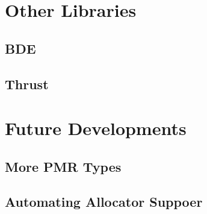 \appendix

\chapter{Other Libraries}
\section{BDE}
\section{Thrust}
\chapter{Future Developments}
\section{More PMR Types}
\section{Automating Allocator Suppoer}

